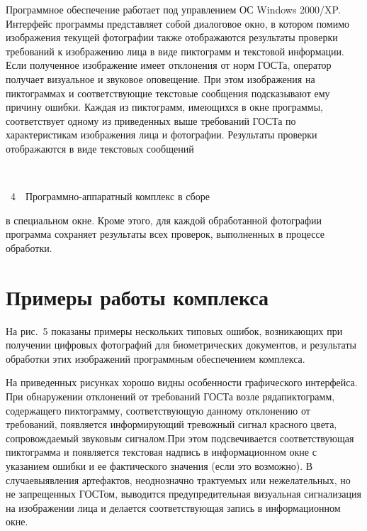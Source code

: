 \begin{multicols}{2}
Программное обеспечение работает под управ\-лением ОС Windows 2000/XP. Интерфейс программы представляет собой 
диалоговое окно, в котором помимо изображения текущей фотографии также отображаются результаты проверки требований к 
изображению лица в виде пиктограмм и текстовой информации. Если полученное изображение имеет отклонения от норм ГОСТа, 
оператор получает визуальное и звуковое оповещение. При этом изображения на пиктограммах и соответствующие текстовые 
сообщения подсказывают ему причину
 ошибки. Каждая из пиктограмм, имеющихся в окне программы, соответствует одному из 
приведенных выше требований ГОСТа по характеристикам изображения лица и фотографии. Результаты 
проверки отображаются 
в виде текстовых сообщений\linebreak\vspace*{-12pt}
\begin{center} %
\vspace*{4pt}
\mbox{%
\epsfxsize=79.8mm
}

\vspace*{9pt}
{{\figurename~4}\ \ \small{Программно-аппаратный комплекс в сборе}}
\end{center}
\vspace*{-4pt}


\bigskip
\addtocounter{figure}{1}

\noindent
в специальном окне. Кроме этого, для каждой обработанной фотографии программа сохраняет 
результаты всех проверок, выполненных в процессе обработки.


\section{Примеры работы комплекса}

На рис.~5 показаны примеры нескольких типовых ошибок, возникающих при получении циф\-ро\-вых 
фотографий для биометрических документов, и результаты обработки этих изображений про\-грам\-мным обеспечением комплекса.


На приведенных рисунках хорошо видны особенности графического интерфейса. При обнаружении отклонений от требований 
ГОСТа возле ряда\linebreak пиктограмм, содержащего пиктограмму, соответствующую данному отклонению от требований, появляется 
информирующий тревожный сигнал красного цвета, сопровождаемый звуковым сигналом.\linebreak При этом подсвечивается 
соответствующая пиктограмма и появляется текстовая надпись в информационном окне с указанием ошибки и ее фактического 
значения (если это возможно). В случае\linebreak выявления артефактов, неоднозначно трактуемых или нежелательных, но не 
запрещенных ГОСТом, выводится предупредительная визуальная сигнализация на изображении лица и делается 
соответствующая запись в информационном окне.


\end{multicols}
